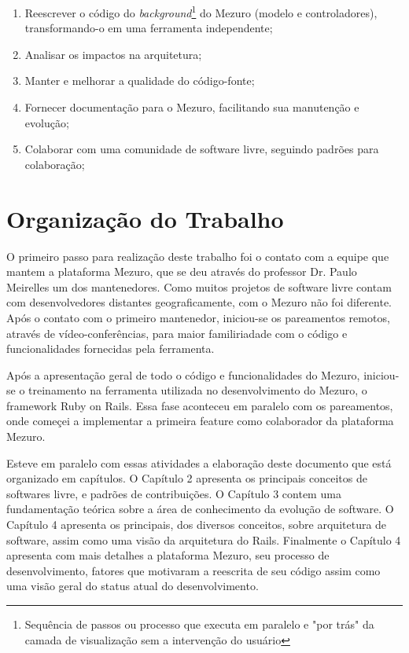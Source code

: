 \begin{enumerate}
\item Reescrever o código do \textit{background}\footnote{Sequência de passos ou processo que executa em paralelo e "por trás" da camada de visualização sem a intervenção do usuário} do Mezuro (modelo e controladores), transformando-o em uma ferramenta independente;
\item Analisar os impactos na arquitetura;
\item Manter e melhorar a qualidade do código-fonte;
\item Fornecer documentação para o Mezuro, facilitando sua manutenção e evolução;
\item Colaborar com uma comunidade de software livre, seguindo padrões para colaboração;
\end{enumerate}

\section{Organização do Trabalho}

O primeiro passo para realização deste trabalho foi o contato com a equipe que mantem a plataforma Mezuro, que se deu através do professor Dr. Paulo Meirelles um dos mantenedores. Como muitos projetos de software livre contam com desenvolvedores distantes geograficamente, com o Mezuro não foi diferente. Após o contato com o primeiro mantenedor, iniciou-se os pareamentos remotos, através de vídeo-conferências, para maior familiriadade com o código e funcionalidades fornecidas pela ferramenta.

Após a apresentação geral de todo o código e funcionalidades do Mezuro, iniciou-se o treinamento na ferramenta utilizada no desenvolvimento do Mezuro, o framework Ruby on Rails. Essa fase aconteceu em paralelo com os pareamentos, onde começei a implementar a primeira feature como colaborador da plataforma Mezuro.

Esteve em paralelo com essas atividades a elaboração deste documento que está organizado em capítulos. O Capítulo 2 apresenta os principais conceitos de softwares livre, e padrões de contribuições. O Capítulo 3 contem uma fundamentação teórica sobre a área de conhecimento da evolução de software. O Capítulo 4 apresenta os principais, dos diversos conceitos, sobre arquitetura de software, assim como uma visão da arquitetura do Rails. Finalmente o Capítulo 4 apresenta com mais detalhes a plataforma Mezuro, seu processo de desenvolvimento, fatores que motivaram a reescrita de seu código assim como uma visão geral do status atual do desenvolvimento.
